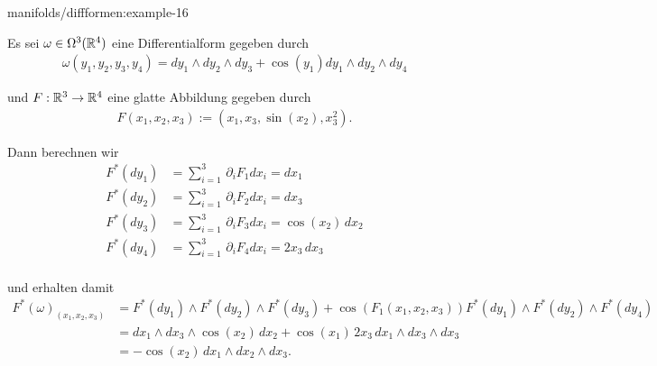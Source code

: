 \begin{example}{}{manifolds/diffformen:example-16}



\par
Es sei \(\omega\in \Omega^3(\mathbb{R}^4)\) eine Differentialform gegeben durch
\begin{align*}
\omega(y_1,y_2,y_3,y_4) = dy_1\wedge dy_2\wedge dy_3 + \cos(y_1)dy_1\wedge dy_2 \wedge dy_4
\end{align*}
\par
und \(F:\mathbb{R}^3\to\mathbb{R}^4\) eine glatte Abbildung gegeben durch
\begin{align*}
F(x_1,x_2,x_3) := (x_1, x_3, \sin(x_2), x_3^2).
\end{align*}
\par
Dann berechnen wir
\begin{align*}
F^\ast(dy_1) &= \sum_{i=1}^3 \,\partial_i F_1 dx_i = dx_1\\
F^\ast(dy_2) &= \sum_{i=1}^3 \,\partial_i F_2 dx_i = dx_3\\
F^\ast(dy_3) &= \sum_{i=1}^3 \,\partial_i F_3 dx_i = \cos(x_2)\,dx_2\\
F^\ast(dy_4) &= \sum_{i=1}^3 \,\partial_i F_4 dx_i = 2x_3\,dx_3\\
\end{align*}
\par
und erhalten damit
\begin{align*}
F^\ast(\omega)_{(x_1,x_2,x_3)} &= F^\ast(dy_1)\wedge F^\ast(dy_2)\wedge F^\ast(dy_3) + 
\cos(F_1(x_1,x_2,x_3)) F^\ast(dy_1)\wedge F^\ast(dy_2)\wedge F^\ast(dy_4)\\
&= dx_1 \wedge dx_3\wedge \cos(x_2)\,dx_2 + \cos(x_1)\, 2x_3\,dx_1\wedge dx_3\wedge dx_3\\
&=  -\cos(x_2)\,dx_1 \wedge dx_2\wedge dx_3.
\end{align*}\end{example}


